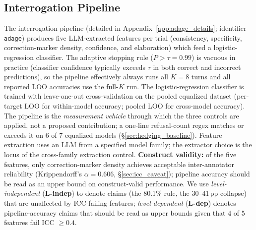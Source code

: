\subsection{Interrogation Pipeline}
\label{sec:system_overview}

The interrogation pipeline (detailed in Appendix~\ref{app:adage_details}; identifier \texttt{adage}) produces five LLM-extracted features per trial (consistency, specificity, correction-marker density, confidence, and elaboration) which feed a logistic-regression classifier. The adaptive stopping rule ($P\!>\!\tau\!=\!0.99$) is vacuous in practice (classifier confidence typically exceeds $\tau$ in both correct and incorrect predictions), so the pipeline effectively always runs all $K\!=\!8$ turns and all reported LOO accuracies use the full-$K$ run. The logistic-regression classifier is trained with leave-one-out cross-validation on the pooled equalized dataset (per-target LOO for within-model accuracy; pooled LOO for cross-model accuracy). The pipeline is the \emph{measurement vehicle} through which the three controls are applied, not a proposed contribution; a one-line refusal-count regex matches or exceeds it on 6 of 7 equalized models (§\ref{sec:hedging_baseline}). Feature extraction uses an LLM from a specified model family; the extractor choice is the locus of the cross-family extraction control. \textbf{Construct validity:} of the five features, only correction-marker density achieves acceptable inter-annotator reliability (Krippendorff's $\alpha=0.606$, §\ref{sec:icc_caveat}); pipeline accuracy should be read as an upper bound on construct-valid performance. We use \emph{level-independent} (\textbf{L-indep}) to denote claims (the 80.1\% rule, the 30--41\,pp collapse) that are unaffected by ICC-failing features; \emph{level-dependent} (\textbf{L-dep}) denotes pipeline-accuracy claims that should be read as upper bounds given that 4 of 5 features fail ICC $\geq 0.4$.
